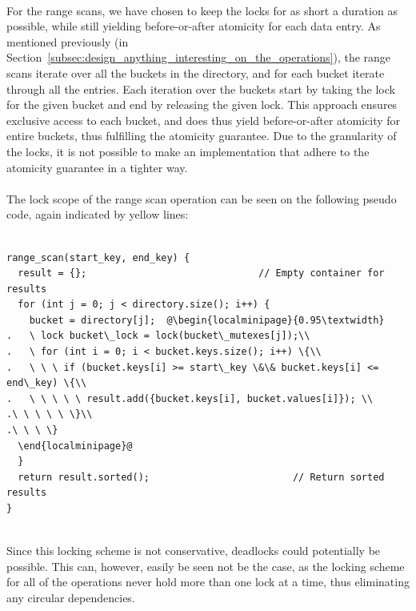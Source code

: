 \documentclass[11pt]{article} %
\begin{document}
\vphantom{fill}\\
For the range scans, we have chosen to keep the locks for as short a duration as possible, while still yielding before-or-after atomicity for each data entry. As mentioned previously (in Section~\ref{subsec:design_anything_interesting_on_the_operations}), the range scans iterate over all the buckets in the directory, and for each bucket iterate through all the entries. Each iteration over the buckets start by taking the lock for the given bucket and end by releasing the given lock. This approach ensures exclusive access to each bucket, and does thus yield before-or-after atomicity for entire buckets, thus fulfilling the atomicity guarantee. Due to the granularity of the locks, it is not possible to make an implementation that adhere to the atomicity guarantee in a tighter way.\\
\\
The lock scope of the range scan operation can be seen on the following pseudo code, again indicated by yellow lines:\\
\\
\begin{fminipage}{\linewidth}
\begin{lstlisting}[escapechar=@]
range_scan(start_key, end_key) {
  result = {};                              // Empty container for results
  for (int j = 0; j < directory.size(); i++) {
    bucket = directory[j];  @\begin{localminipage}{0.95\textwidth}
.   \ lock bucket\_lock = lock(bucket\_mutexes[j]);\\
.   \ for (int i = 0; i < bucket.keys.size(); i++) \{\\
.   \ \ \ if (bucket.keys[i] >= start\_key \&\& bucket.keys[i] <= end\_key) \{\\
.   \ \ \ \ \ result.add({bucket.keys[i], bucket.values[i]}); \\
.\ \ \ \ \ \}\\
.\ \ \ \}
  \end{localminipage}@
  }
  return result.sorted();                         // Return sorted results
}
\end{lstlisting}
\end{fminipage}
\vphantom{fill}\\
Since this locking scheme is not conservative, deadlocks could potentially be possible. This can, however, easily be seen not be the case, as the locking scheme for all of the operations never hold more than one lock at a time, thus eliminating any circular dependencies.
\end{document}
